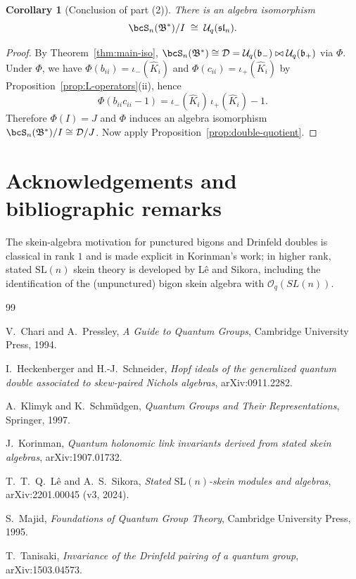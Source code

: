 \documentclass[11pt]{article}
\newtheorem{corollary}{Corollary}
\theoremstyle{definition}
\newcommand{\Uc}{\mathcal{U}}
\newcommand{\fsl}{\mathfrak{sl}}
\newcommand{\fb}{\mathfrak{b}}
\newcommand{\bipr}{\bowtie}
\newcommand{\Khat}{\widehat{K}}
\begin{document}
\begin{corollary}[Conclusion of part (2)]
There is an algebra isomorphism
\[
\bcS_n(\mathfrak B^*)/I \;\cong\; \Uc_q(\fsl_n).
\]
\end{corollary}

\begin{proof}
By Theorem~\ref{thm:main-iso}, $\bcS_n(\mathfrak B^*)\cong \mathcal{D}=\Uc_q(\fb_-)\bipr \Uc_q(\fb_+)$ via $\Phi$.
Under $\Phi$, we have $\Phi(b_{ii})=\iota_-(\Khat_i)$ and $\Phi(c_{ii})=\iota_+(\Khat_i)$ by Proposition~\ref{prop:L-operators}(ii), hence
\[
\Phi(b_{ii}c_{ii}-1)=\iota_-(\Khat_i)\,\iota_+(\Khat_i)-1.
\]
Therefore $\Phi(I)=J$ and $\Phi$ induces an algebra isomorphism $\bcS_n(\mathfrak B^*)/I\cong \mathcal{D}/J$.
Now apply Proposition~\ref{prop:double-quotient}.
\end{proof}


\section*{Acknowledgements and bibliographic remarks}
The skein-algebra motivation for punctured bigons and Drinfeld doubles is classical in rank $1$ and is made explicit in Korinman's work; in higher rank, stated $\mathrm{SL}(n)$ skein theory is developed by L\^e and Sikora, including the identification of the (unpunctured) bigon skein algebra with $\mathcal{O}_q(SL(n))$.  %

\begin{thebibliography}{99}

V.~Chari and A.~Pressley,
\emph{A Guide to Quantum Groups},
Cambridge University Press, 1994.

I.~Heckenberger and H.-J.~Schneider,
\emph{Hopf ideals of the generalized quantum double associated to skew-paired Nichols algebras},
arXiv:0911.2282.

A.~Klimyk and K.~Schm\"udgen,
\emph{Quantum Groups and Their Representations},
Springer, 1997.

J.~Korinman,
\emph{Quantum holonomic link invariants derived from stated skein algebras},
arXiv:1907.01732.

T.~T.~Q.~L\^e and A.~S.~Sikora,
\emph{Stated $\mathrm{SL}(n)$-skein modules and algebras},
arXiv:2201.00045 (v3, 2024).

S.~Majid,
\emph{Foundations of Quantum Group Theory},
Cambridge University Press, 1995.

T.~Tanisaki,
\emph{Invariance of the Drinfeld pairing of a quantum group},
arXiv:1503.04573.

\end{thebibliography}
\end{document}
